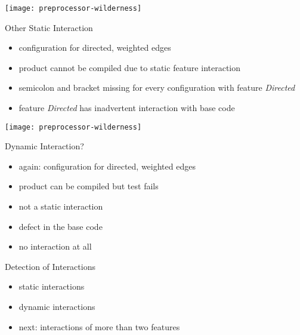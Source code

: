 \begin{frame}{\myframetitle}
	\begin{mycolumns}[widths={75}]
		\texttt{[image: preprocessor-wilderness]}
	\mynextcolumn
		\begin{example}{Other Static Interaction}\setlength\leftmargini{3mm}
			\begin{itemize}
				\item configuration for directed, weighted edges
				\item product cannot be compiled due to static feature interaction
				\item semicolon and bracket missing for every configuration with feature \emph{Directed}
				\item feature \emph{Directed} has inadvertent interaction with base code
			\end{itemize}
		\end{example}
	\end{mycolumns}
\end{frame}
\begin{frame}{\myframetitle}\setlength\leftmargini{3mm}
	\begin{mycolumns}[widths={70}]
		\texttt{[image: preprocessor-wilderness]}
	\mynextcolumn
		\begin{example}{Dynamic Interaction?}
			\begin{itemize}
				\item again: configuration for directed, weighted edges
				\item product can be compiled but test fails
				\item not a static interaction
				\item defect in the base code
				\item no interaction at all
			\end{itemize}
		\end{example}
		\begin{note}{Detection of Interactions}
			\begin{itemize}
				\item static interactions \lectureanalyses
				\item dynamic interactions \lecturetesting
				\item next: interactions of more than two features
			\end{itemize}
		\end{note}
	\end{mycolumns}
\end{frame}

